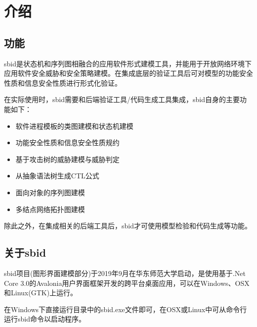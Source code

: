 \chapter{介绍}

\section{功能}
sbid是状态机和序列图相融合的应用软件形式建模工具，并能用于开放网络环境下应用软件安全威胁和安全策略建模。在集成底层的验证工具后可对模型的功能安全性质和信息安全性质进行形式化验证。
\par
在实际使用时，sbid需要和后端验证工具/代码生成工具集成，sbid自身的主要功能如下：
    \begin{itemize}
	\item{软件进程模板的类图建模和状态机建模}
	\item{功能安全性质和信息安全性质规约}
	\item{基于攻击树的威胁建模与威胁判定}
	\item{从抽象语法树生成CTL公式}
	\item{面向对象的序列图建模}
	\item{多结点网络拓扑图建模}
	\end{itemize}
\par
除此之外，在集成相关的后端工具后，sbid才可使用模型检验和代码生成等功能。

\section{关于sbid}
sbid项目(图形界面建模部分)于2019年9月在华东师范大学启动，是使用基于.Net Core 3.0的Avalonia用户界面框架开发的跨平台桌面应用，可以在Windows、OSX和Linux(GTK)上运行。
\par
在Windows下直接运行目录中的sbid.exe文件即可，在OSX或Linux中可从命令行运行sbid命令以启动程序。

